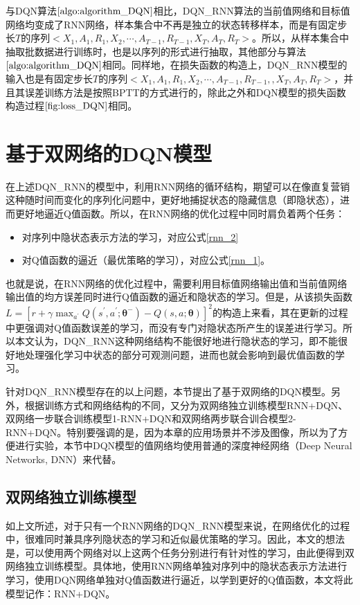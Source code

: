  与DQN算法$\ref{algo:algorithm_DQN}$相比，DQN\_RNN算法的当前值网络和目标值网络均变成了RNN网络，样本集合中不再是独立的状态转移样本，而是有固定步长$T$的序列$<X_{1}, A_{1}, R_{1}, X_{2}, \cdots, A_{T-1}, R_{T-1}, X_{T}, A_{T}, R_{T}>$。所以，从样本集合中抽取批数据进行训练时，也是以序列的形式进行抽取，其他部分与算法$\ref{algo:algorithm_DQN}$相同。同样地，在损失函数的构造上，DQN\_RNN模型的输入也是有固定步长$T$的序列$<X_{1}, A_{1}, R_{1}, X_{2}, \cdots, A_{T-1}, R_{T-1}, ,X_{T}, A_{T}, R_{T}>$，并且其误差训练方法是按照BPTT的方式进行的\citep{bersini1997simplification}，除此之外和DQN模型的损失函数构造过程$\ref{fig:loss_DQN}$相同。


\section{基于双网络的DQN模型}
在上述DQN\_RNN的模型中，利用RNN网络的循环结构，期望可以在像直复营销这种随时间而变化的序列化问题中，更好地捕捉状态的隐藏信息（即隐状态），进而更好地逼近Q值函数。所以，在RNN网络的优化过程中同时肩负着两个任务：

\begin{itemize}
\item 对序列中隐状态表示方法的学习，对应公式\eqref{rnn_2}
\item 对Q值函数的逼近（最优策略的学习），对应公式\eqref{rnn_1}。
\end{itemize}

也就是说，在RNN网络的优化过程中，需要利用目标值网络输出值和当前值网络输出值的均方误差同时进行Q值函数的逼近和隐状态的学习。但是，从该损失函数$L=[r+\gamma \max_{a^{'}}Q(s^{'},a^{'};\bm{\theta}^{-})-Q(s,a;\bm{\theta})]^{2}$的构造上来看，其在更新的过程中更强调对Q值函数误差的学习，而没有专门对隐状态所产生的误差进行学习。所以本文认为，DQN\_RNN这种网络结构不能很好地进行隐状态的学习，即不能很好地处理强化学习中状态的部分可观测问题，进而也就会影响到最优值函数的学习。

针对DQN\_RNN模型存在的以上问题，本节提出了基于双网络的DQN模型。另外，根据训练方式和网络结构的不同，又分为双网络独立训练模型RNN+DQN、双网络一步联合训练模型1-RNN+DQN和双网络两步联合训合模型2-RNN+DQN。特别要强调的是，因为本章的应用场景并不涉及图像，所以为了方便进行实验，本节中DQN模型的值网络均使用普通的深度神经网络（Deep Neural Networks, DNN）来代替。

\subsection{双网络独立训练模型}
如上文所述，对于只有一个RNN网络的DQN\_RNN模型来说，在网络优化的过程中，很难同时兼具序列隐状态的学习和近似最优策略的学习。因此，本文的想法是，可以使用两个网络对以上这两个任务分别进行有针对性的学习，由此便得到双网络独立训练模型。具体地，使用RNN网络单独对序列中的隐状态表示方法进行学习，使用DQN网络单独对Q值函数进行逼近，以学到更好的Q值函数，本文将此模型记作：RNN+DQN。

